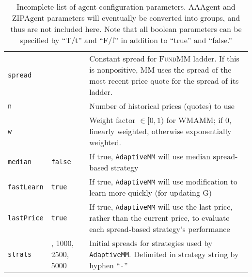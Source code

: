 \documentclass[11pt]{article}
\begin{document}
\begin{table}
\begin{tabular}{p{} >{\centering\arraybackslash}p{} p{}}
\texttt{spread} & -1 &	 Constant spread for \textsc{FundMM} ladder. If this is nonpositive, MM uses the spread of the most recent price quote for the spread of its ladder. \\
\texttt{n} 	& 5 & Number of historical prices (quotes) to use \\
\texttt{w} 	& 0 & Weight factor $\in [0,1)$ for \textsc{WMAMM}; if 0, linearly weighted, otherwise exponentially weighted. \\

\texttt{median} 	& \texttt{false}	& If true, \texttt{AdaptiveMM} will use median spread-based strategy \\
\texttt{fastLearn}	 & \texttt{true} & If true, \texttt{AdaptiveMM} will use modification to learn more quickly (for updating G) \\
\texttt{lastPrice} & \texttt{true} & If true, \texttt{AdaptiveMM} will use the last price, rather than the current price, to evaluate each spread-based strategy's performance \\
\texttt{strats} 	& 500, 1000, 2500, 5000 & Initial spreads for strategies used by \texttt{AdaptiveMM}. Delimited in strategy string by hyphen ``\texttt{-}'' \\

\end{tabular}
\caption{Incomplete list of agent configuration parameters. AAAgent and ZIPAgent parameters will eventually be converted into groups, and thus are not included here. Note that all boolean parameters can be specified by ``T/t'' and ``F/f'' in addition to ``true'' and ``false.''}
\label{tab:ag}
\end{table}
\end{document}
